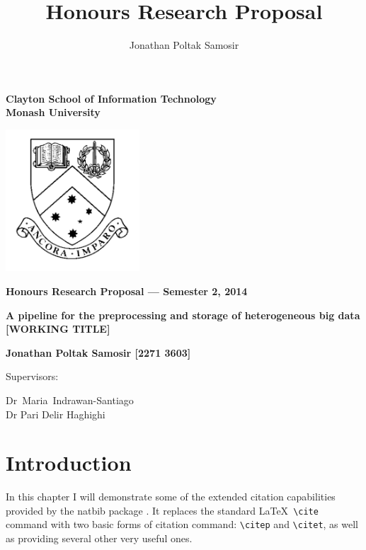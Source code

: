 \documentclass[a4paper,11pt]{article}
\author{Jonathan Poltak Samosir}
\title{Honours Research Proposal}
\begin{document}
\thispagestyle{empty} %
\renewcommand{\thepage}{\roman{page}}

\begin{spacing}{1.5}
\begin{center}
{\Large \bfseries
Clayton School of Information Technology\\
Monash University}

\vspace*{30mm}

\includegraphics[width=5cm]{img/MonashCrest.pdf}

\vspace*{15mm}

{\large \bfseries
Honours Research Proposal --- Semester 2, 2014
}

\vspace*{10mm}

{\LARGE \bfseries
A pipeline for the preprocessing and storage of heterogeneous big data [WORKING TITLE]
}

\vspace*{20mm}

{\large \bfseries
Jonathan Poltak Samosir [2271 3603]

\vspace*{20mm}

Supervisors: \parbox[t]{50mm}{\mbox{Dr Maria Indrawan-Santiago}\\Dr Pari Delir Haghighi}
}

\end{center}
\end{spacing}

\newpage

\tableofcontents

\newpage
\setcounter{page}{1}
\renewcommand{\thepage}{\arabic{page}}

\section{Introduction}
In this chapter I will demonstrate some of the extended citation
capabilities provided by the {\sf natbib} package \cite{Dal1999}. It
replaces the standard \LaTeX\ \verb+\cite+ command with two basic forms of
citation command: \verb+\citep+ and \verb+\citet+, as well as providing
several other very useful ones.
\end{document}
